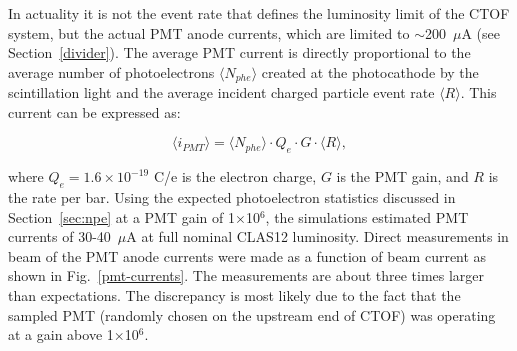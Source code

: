 \documentclass{elsart}
\begin{document}
In actuality it is not the event rate that defines the luminosity limit of the CTOF system, but the actual
PMT anode currents, which are limited to $\sim$200~$\mu$A (see Section~\ref{divider}). The average
PMT current is directly proportional to the average number of photoelectrons $\langle N_{phe} \rangle$
created at the photocathode by the scintillation light and the average incident charged particle event rate
$\langle R \rangle$. This current can be expressed as:

\begin{equation}
\langle i_{PMT} \rangle = \langle N_{phe} \rangle \cdot Q_e \cdot G \cdot \langle R \rangle,
\end{equation}

\noindent
where $Q_e = 1.6 \times 10^{-19}$ C/e is the electron charge, $G$ is the PMT gain, and $R$ is the rate
per bar. Using the expected photoelectron statistics discussed in Section~\ref{sec:npe} at a PMT gain
of 1$\times$10$^6$, the simulations estimated PMT currents of 30-40~$\mu$A at full nominal CLAS12
luminosity. Direct measurements in beam of the PMT anode currents were made as a function of beam
current as shown in Fig.~\ref{pmt-currents}. The measurements are about three times larger than
expectations. The discrepancy is most likely due to the fact that the sampled PMT (randomly chosen on
the upstream end of CTOF) was operating at a gain above 1$\times$10$^6$.
\end{document}
